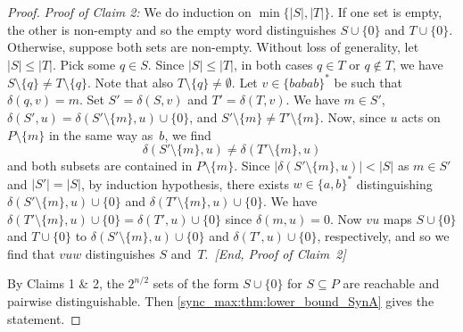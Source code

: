 \begin{proof}
	\medskip 
	\noindent\emph{Proof of Claim 2:} 
	We do induction on $\min\{|S|, |T|\}$.
	If one set is empty, the other is non-empty
	and so the empty word distinguishes $S \cup \{0\}$ and $T \cup \{0\}$.
	Otherwise, suppose both sets are non-empty.	
	Without loss of generality, let $|S| \le |T|$.
	Pick some $q \in S$.
	Since $|S| \le |T|$, in both cases $q \in T$
	or $q \notin T$,
	we have $S \setminus \{q\} \ne T \setminus \{q\}$.
	Note that also $T \setminus \{q\} \ne \emptyset$.
	Let $v \in \{babab\}^*$ be such that $\delta(q, v) = m$.
	Set $S' = \delta(S, v)$
	and $T' = \delta(T, v)$.
	We have $m \in S'$,
	$\delta(S', u) = \delta(S' \setminus \{m\}, u) \cup \{0\}$,
	and $S' \setminus \{m\} \ne T' \setminus \{m\}$.
    Now, since $u$ acts on~$P \setminus \{m\}$ in the same way as~$b$, we find
    \[
    \delta(S' \setminus \{m\}, u) \ne \delta(T' \setminus \{m\}, u)
    \]
    and both subsets are contained in $P \setminus \{m\}$.
    Since $|\delta(S' \setminus \{m\}, u)| < |S|$ as $m \in S'$ and $|S'| = |S|$,
    by induction hypothesis,
    there exists $w \in \{a,b\}^*$
    distinguishing $\delta(S' \setminus \{m\}, u) \cup \{0\}$
    and $\delta(T' \setminus \{m\}, u) \cup \{0\}$.    
    We have  $\delta(T' \setminus \{m\}, u) \cup \{0\}
    = \delta(T', u) \cup \{0\}$
    since $\delta(m, u) = 0$.
    Now $vu$ maps $S \cup \{0\}$
    and $T \cup \{0\}$ to $\delta(S' \setminus \{m\}, u) \cup \{0\}$
    and $\delta(T', u) \cup \{0\}$, respectively,
    and so we find that $vuw$
    distinguishes $S$ and~$T$.~\emph{[End, Proof of Claim~2]}
    
	\medskip
	
	By Claims 1 \& 2, the $2^{n / 2}$ sets of the form $S \cup \{0\}$ for $S \subseteq P$
	are reachable and pairwise distinguishable. Then \cref{sync_max:thm:lower_bound_SynA} 
	gives the statement.
\end{proof}

